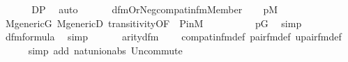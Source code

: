 \begin{isabellebody}
\isanewline
\ \ \isamarkupfalse%
\isanewline
\ \ \isamarkupfalse%
\ {\isachardoublequoteopen}{\isacharquery}{\kern0pt}D{\isasymsubseteq}P{\isachardoublequoteclose}\ \isamarkupfalse%
\ auto\isanewline
\ \ \isanewline
\ \ \isamarkupfalse%
\ {\isacharquery}{\kern0pt}d{\isacharunderscore}{\kern0pt}fm{\isacharequal}{\kern0pt}{\isachardoublequoteopen}Or{\isacharparenleft}{\kern0pt}Neg{\isacharparenleft}{\kern0pt}compat{\isacharunderscore}{\kern0pt}in{\isacharunderscore}{\kern0pt}fm{\isacharparenleft}{\kern0pt}{}{\isacharcomma}{\kern0pt}{}{\isacharcomma}{\kern0pt}{}{\isacharcomma}{\kern0pt}{}{\isacharparenright}{\kern0pt}{\isacharparenright}{\kern0pt}{\isacharcomma}{\kern0pt}Member{\isacharparenleft}{\kern0pt}{}{\isacharcomma}{\kern0pt}{}{\isacharparenright}{\kern0pt}{\isacharparenright}{\kern0pt}{\isachardoublequoteclose}\isanewline
\ \ \isamarkupfalse%
\ {}{\isacharcolon}{\kern0pt}{\isachardoublequoteopen}p{\isasymin}M{\isachardoublequoteclose}\ \isanewline
\ \ \ \ \isamarkupfalse%
\ {\isacartoucheopen}M{\isacharunderscore}{\kern0pt}generic{\isacharparenleft}{\kern0pt}G{\isacharparenright}{\kern0pt}{\isacartoucheclose}\ M{\isacharunderscore}{\kern0pt}genericD\ transitivity{\isacharbrackleft}{\kern0pt}OF\ {\isacharunderscore}{\kern0pt}\ P{\isacharunderscore}{\kern0pt}in{\isacharunderscore}{\kern0pt}M{\isacharbrackright}{\kern0pt}\isanewline
\ \ \ \ \ \ \ \ \ \ {\isacartoucheopen}p{\isasymin}G{\isacartoucheclose}\ \isamarkupfalse%
\ simp\isanewline
\ \ \isamarkupfalse%
\isanewline
\ \ \isamarkupfalse%
\ {\isachardoublequoteopen}{\isacharquery}{\kern0pt}d{\isacharunderscore}{\kern0pt}fm{\isasymin}formula{\isachardoublequoteclose}\ \isamarkupfalse%
\ simp\isanewline
\ \ \isamarkupfalse%
\isanewline
\ \ \isamarkupfalse%
\ {\isachardoublequoteopen}arity{\isacharparenleft}{\kern0pt}{\isacharquery}{\kern0pt}d{\isacharunderscore}{\kern0pt}fm{\isacharparenright}{\kern0pt}\ {\isacharequal}{\kern0pt}\ {}{\isachardoublequoteclose}\ \isamarkupfalse%
\ compat{\isacharunderscore}{\kern0pt}in{\isacharunderscore}{\kern0pt}fm{\isacharunderscore}{\kern0pt}def\ pair{\isacharunderscore}{\kern0pt}fm{\isacharunderscore}{\kern0pt}def\ upair{\isacharunderscore}{\kern0pt}fm{\isacharunderscore}{\kern0pt}def\isanewline
\ \ \ \ \isamarkupfalse%
\ {\isacharparenleft}{\kern0pt}simp\ add{\isacharcolon}{\kern0pt}\ nat{\isacharunderscore}{\kern0pt}union{\isacharunderscore}{\kern0pt}abs{}\ Un{\isacharunderscore}{\kern0pt}commute{\isacharparenright}{\kern0pt}\isanewline

\end{isabellebody}
